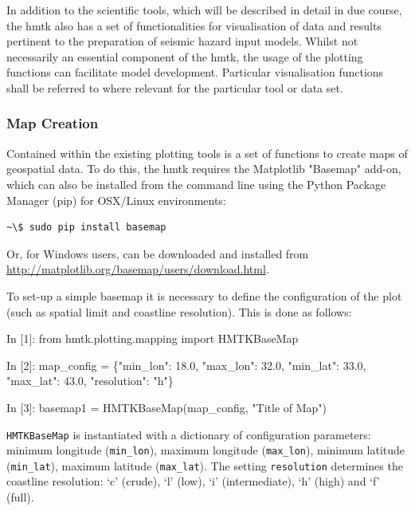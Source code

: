 In addition to the scientific tools, which will be described in detail in due course, the hmtk also has a set of functionalities for visualisation of data and results pertinent to the preparation of seismic hazard input models. Whilst not necessarily an essential component of the hmtk, the usage of the plotting functions can facilitate model development. Particular visualisation functions shall be referred to where relevant for the particular tool or data set. 

\subsubsection{Map Creation}

Contained within the existing plotting tools is a set of functions to create maps of geospatial data. To do this, the hmtk requires the Matplotlib "Basemap" add-on, which can also be installed from the command line using the Python Package Manager (pip) for OSX/Linux environments:

\begin{Verbatim}[frame=single, commandchars=\\\{\}, fontsize=\scriptsize]
~\$ sudo pip install basemap
\end{Verbatim}   

Or, for Windows users, can be downloaded and installed from\\ \href{http://matplotlib.org/basemap/users/download.html}{http://matplotlib.org/basemap/users/download.html}. 

To set-up a simple basemap it is necessary to define the configuration of the plot (such as spatial limit and coastline resolution). This is done as follows:

\begin{python}[frame=single]
In [1]: from hmtk.plotting.mapping import HMTKBaseMap

In [2]: map_config = \{"min_lon": 18.0,
                       "max_lon": 32.0,
                       "min_lat": 33.0,
                       "max_lat": 43.0,
                       "resolution": "h"\}

In [3]: basemap1 = HMTKBaseMap(map_config, "Title of Map")
\end{python}

\verb=HMTKBaseMap= is instantiated with a dictionary of configuration parameters: minimum longitude (\verb=min_lon=), maximum longitude (\verb=max_lon=), minimum latitude (\verb=min_lat=), maximum latitude (\verb=max_lat=). The setting \verb=resolution= determines the coastline resolution: `c' (crude), `l' (low), `i' (intermediate), `h' (high) and `f' (full).

